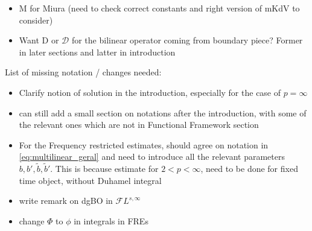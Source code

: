 \documentclass[%
11pt,  reqno]{amsart}
\newcommand{\5}{\textup{V}}
\newcommand{\FL}{\mathcal{F} L}
\newcommand{\wt}{\widetilde}
\theoremstyle{remark}
\newcommand{\R}{\mathbb{R}}
\numberwithin{equation}{section}
\numberwithin{theorem}{section}
\newcommand{\MM}{\mathrm{M}}
\newcommand{\D}{\mathrm{D}}
\newcommand{\DD}{\mathcal{D}}
\begin{document}
\begin{itemize}
\item $\MM$ for Miura (need to check correct constants and right version of mKdV to consider)

\item Want $\D$ or $\DD$ for the bilinear operator coming from boundary piece? Former in later sections and latter in introduction
    
\end{itemize}
    
    List of missing notation / changes needed:
    \begin{itemize}

    \item Clarify notion of solution in the introduction, especially for the case of $p=\infty$

    







\item can still add a small section on notations after the introduction, with some of the relevant ones which are not in Functional Framework section


\item For the Frequency restricted estimates, should agree on notation in \eqref{eq:multilinear_geral}
 and need to introduce all the relevant parameters $b, b', \wt b , \wt b '$. This is because estimate for $2<p<\infty$, need to be done for fixed time object, without Duhamel integral

 \item write remark on dgBO in $\FL^{s, \infty}$

 \item change $\Phi$ to $\phi$ in integrals in FREs


    \end{itemize}


    
    \newpage
	
	
	
	
		
		
		
		
\end{document}

